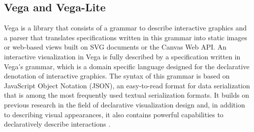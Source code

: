 
\subsection{Vega and Vega-Lite}

Vega \parencite{Vega} is a library that consists of a grammar to describe interactive graphics and a parser that translates specifications written in this grammar into static images or web-based views built on SVG documents or the Canvas Web API. 
An interactive visualization in Vega is fully described by a specification written in Vega's grammar, which is a domain specific language designed for the declarative denotation of interactive graphics. 
The syntax of this grammar is based on JavaScript Object Notation (JSON), an easy-to-read format for data serialization that is among the most frequently used textual serialization formats. 
It builds on previous research in the field of declarative visualization design \parencite{GrammarOfGraphics} and, in addition to describing visual appearances, it also contains powerful capabilities to declaratively describe interactions \parencite{ReactiveVega}. 

